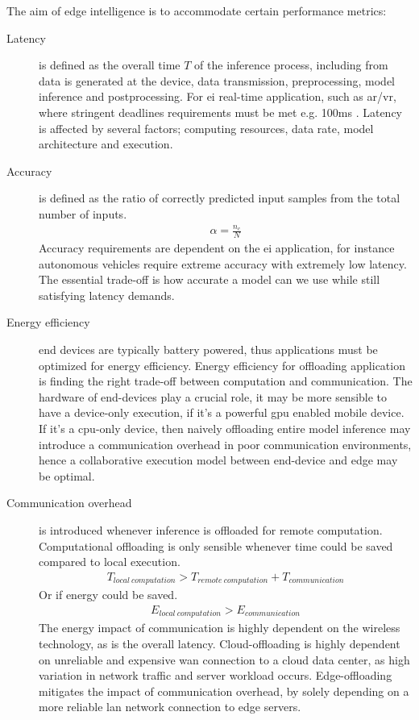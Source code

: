 The aim of edge intelligence is to accommodate certain performance metrics:

\begin{description}
	\item[Latency] is defined as the overall time $T$ of the inference process, including from data is generated at the device, data transmission, preprocessing, model inference and postprocessing. For \gls{ei} real-time application, such as \gls{ar}/\gls{vr}, where stringent deadlines requirements must be met e.g. 100ms \cite{bibid}. Latency is affected by several factors; computing resources, data rate, model architecture and execution.
	
	\item[Accuracy] is defined as the ratio of correctly predicted input samples from the total number of inputs. 
	\begin{align*}
		\alpha = \frac{n_c}{N}
	\end{align*}
	Accuracy requirements are dependent on the \gls{ei} application, for instance autonomous vehicles require extreme accuracy with extremely low latency. The essential trade-off is how accurate a model can we use while still satisfying latency demands.  
	
	\item[Energy efficiency] end devices are typically battery powered, thus applications must be optimized for energy efficiency. Energy efficiency for offloading application is finding the right trade-off between computation and communication. The hardware of end-devices play a crucial role, it may be more sensible to have a device-only execution, if it's a powerful \gls{gpu} enabled mobile device. If it's a \gls{cpu}-only device, then naively offloading entire model inference may introduce a communication overhead in poor communication environments, hence a collaborative execution model between end-device and edge may be optimal. 
	
	\item[Communication overhead] is introduced whenever inference is offloaded for remote computation. Computational offloading is only sensible whenever time could be saved compared to local execution.
	\begin{align*}
	T_{local\: computation} > T_{remote\: computation} + T_{communication}
	\end{align*}
	Or if energy could be saved.
	\begin{align*}
		E_{local\: computation} > E_{communication}
	\end{align*}
	The energy impact of communication is highly dependent on the wireless technology, as is the overall latency. Cloud-offloading is highly dependent on unreliable and expensive \gls{wan} connection to a cloud data center, as high variation in network traffic and server workload occurs. Edge-offloading mitigates the impact of communication overhead, by solely depending on a more reliable \gls{lan} network connection to edge servers.  
	 

\end{description}
